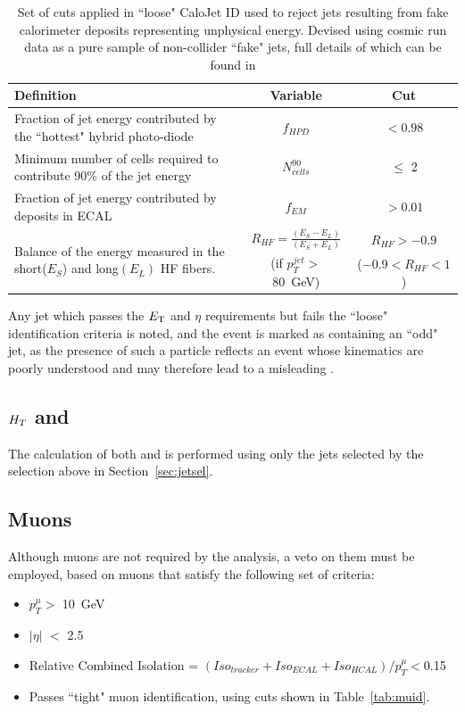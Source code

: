 \begin{table}[htbp]
\centering
\begin{tabular}{ m{6.6cm} c c }
\hline
\hline
 \centering Definition & Variable & Cut \\
\hline
\hline
 \centering Fraction of jet energy contributed by the ``hottest" hybrid photo-diode & $f_{HPD}$ & $< 0.98$ \\
 \centering Minimum number of cells required to contribute 90\% of the jet energy & $N^{90}_{cells}$ & $\leq$ 2 \\
 \centering Fraction of jet energy contributed by deposits in ECAL & $f_{EM}$ & $> 0.01$ \\
\multirow{2}{6.9cm}{Balance of the energy measured in the short($E_{S}$) and long$(E_{L})$ HF fibers.} & $R_{HF} = \frac{(E_{S} - E_{L})}{ (E_{S} + E_{L})}$ & $R_{HF} > - 0.9$\\
& (if $p_{T}^{jet}>$ 80~GeV) & ($-0.9 < R_{HF} < 1$)\\
\hline
\end{tabular}
\caption{\label{tab:jetid} Set of cuts applied in ``loose" CaloJet ID used to reject jets resulting from fake calorimeter deposits representing unphysical energy. Devised using cosmic run data as a pure sample of non-collider ``fake" jets, full details of which can be found in \cite{JME-09-008}}
\end{table}


Any jet which passes the ${E_{\text T}}$ and $\eta$ requirements but fails the ``loose" identification criteria is noted, and the event is marked as containing an ``odd" jet, as the presence of such a particle reflects an event whose kinematics are poorly understood and may therefore lead to a misleading \MHT.
\subsection{$H_{T} $ and \MHT}
The calculation of both \HT and \MHT is performed using only the jets selected by the selection above in Section~\ref{sec:jetsel}.

\subsection{Muons}
Although muons are not required by the analysis, a veto on them must be employed, based on muons that satisfy the following set of criteria:
\begin{itemize}
\item $p^{\mu}_{T} >$ 10~GeV
\item $| \eta|$ $<$ 2.5
\item Relative Combined Isolation = $(Iso_{tracker} + Iso_{ECAL} + Iso_{HCAL}) / p^{\mu}_{T} < $0.15\footnotemark
\item Passes ``tight" muon identification, using cuts shown in Table~\ref{tab:muid}.
\end{itemize}

